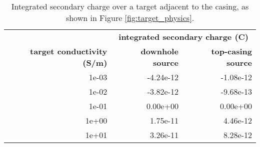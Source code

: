 \begin{table}
\centering
    \begin{tabular}[htb]{| r | r | r |}
        \hline
                                           & \multicolumn{2}{|c|}{\textbf{integrated secondary charge (C)}} \\
        \textbf{target conductivity (S/m)} & \textbf{downhole source} & \textbf{top-casing source} \\
        \hline
        1e-03 & -4.24e-12 & -1.08e-12 \\
        1e-02 & -3.82e-12 & -9.68e-13 \\
        1e-01 & 0.00e+00 & 0.00e+00 \\
        1e+00 & 1.75e-11 & 4.46e-12 \\
        1e+01 & 3.26e-11 & 8.28e-12 \\
        \hline
    \end{tabular}
    \caption{Integrated secondary charge over a target adjacent to the casing, as shown in Figure \ref{fig:target_physics}.}
    \label{tab:target_charge}
 \end{table}
